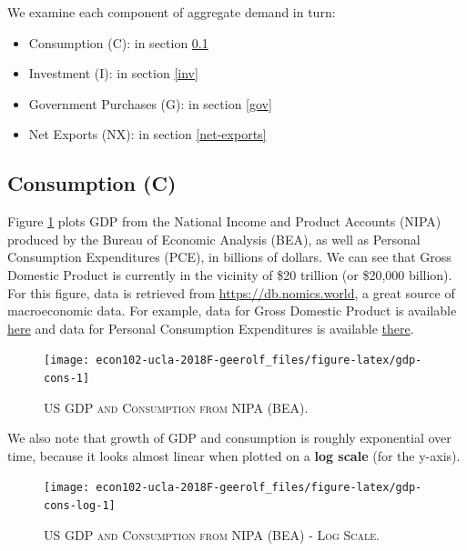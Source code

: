 \documentclass[]{book}
\providecommand{\tightlist}{%
  \setlength{\itemsep}{0pt}\setlength{\parskip}{0pt}}
\begin{document}
We examine each component of aggregate demand in turn:

\begin{itemize}
\tightlist
\item
  Consumption (C): in section \ref{cons}
\item
  Investment (I): in section \ref{inv}
\item
  Government Purchases (G): in section \ref{gov}
\item
  Net Exports (NX): in section \ref{net-exports}
\end{itemize}

\subsection{Consumption (C)}\label{cons}

Figure \ref{fig:gdp-cons} plots GDP from the National Income and Product
Accounts (NIPA) produced by the Bureau of Economic Analysis (BEA), as
well as Personal Consumption Expenditures (PCE), in billions of dollars.
We can see that Gross Domestic Product is currently in the vicinity of
\$20 trillion (or \$20,000 billion). For this figure, data is retrieved
from \url{https://db.nomics.world}, a great source of macroeconomic
data. For example, data for Gross Domestic Product is available
\href{https://db.nomics.world/BEA/NIPA-T10105/A191RC-Q}{here} and data
for Personal Consumption Expenditures is available
\href{https://db.nomics.world/BEA/NIPA-T10105/DPCERC-Q}{there}.



\begin{figure}

{\centering \texttt{[image: econ102-ucla-2018F-geerolf\_files/figure-latex/gdp-cons-1]} 

}

\caption{\textsc{US GDP and Consumption from NIPA (BEA)}.}\label{fig:gdp-cons}
\end{figure}

We also note that growth of GDP and consumption is roughly exponential
over time, because it looks almost linear when plotted on a \textbf{log
scale} (for the y-axis).




\begin{figure}

{\centering \texttt{[image: econ102-ucla-2018F-geerolf\_files/figure-latex/gdp-cons-log-1]} 

}

\caption{\textsc{US GDP and Consumption from NIPA (BEA)
- Log Scale}.}\label{fig:gdp-cons-log}
\end{figure}
\end{document}
